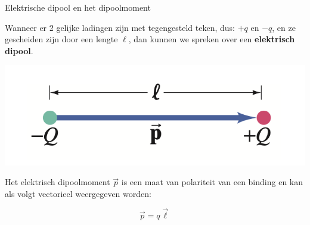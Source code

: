 \begin{theo}{Elektrische dipool en het dipoolmoment}

    Wanneer er 2 gelijke ladingen zijn met tegengesteld teken, dus: $ +q $ en $ -q $, en ze gescheiden zijn door een lengte $ \ell $, dan kunnen we spreken over een \textbf{elektrisch dipool}. \\
    \begin{center}
       \includegraphics[scale = 0.4]{Images/Elektriciteit/Dipool.png} 
    \end{center}
    Het elektrisch dipoolmoment $ \vec{p} $ is een maat van polariteit van een binding en kan als volgt vectorieel weergegeven worden: 
    
    \begin{equation*}
        \Vec{p} = q\Vec{\ell}
    \end{equation*}
\end{theo}

